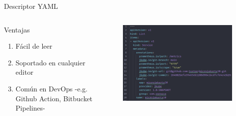 \documentclass[aspectratio=169]{beamer}
\begin{document}
\begin{frame}{Descriptor YAML}
	\begin{columns}[T] %
		
		\begin{column}[T]{4cm} %
        Ventajas
		\begin{enumerate}
			\item Fácil de leer
			\item Soportado en cualquier editor
            \item Común en DevOps -e.g. Github Action, Bitbucket Pipelines-
		\end{enumerate}
		\end{column}
		\begin{column}[T]{7cm} %
			\begin{figure}
            \centering
            \includegraphics[width=\linewidth]{Images/yaml}
            \end{figure}
			
		\end{column}
	\end{columns}
\end{frame}
\end{document}
